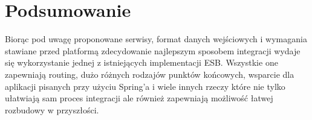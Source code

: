 \section*{Podsumowanie}
Biorąc pod uwagę proponowane serwisy, format danych wejściowych i wymagania stawiane przed platformą zdecydowanie najlepszym sposobem integracji wydaje się wykorzystanie jednej z istniejących implementacji ESB. Wszystkie one zapewniają routing, dużo różnych rodzajów punktów końcowych, wsparcie dla aplikacji pisanych przy użyciu Spring'a i wiele innych rzeczy które nie tylko ułatwiają sam proces integracji ale również zapewniają możliwość łatwej rozbudowy w przyszłości.





















